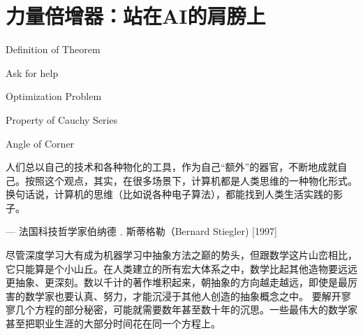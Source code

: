 \chapter{力量倍增器：站在AI的肩膀上}
 \begin{introduction}
  \item Definition of Theorem
  \item Ask for help
  \item Optimization Problem
  \item Property of Cauchy Series
  \item Angle of Corner
\end{introduction}


人们总以自己的技术和各种物化的工具，作为自己“额外”的器官，不断地成就自己。按照这个观点，其实，在很多场景下，计算机都是人类思维的一种物化形式。换句话说，计算机的思维（比如说各种电子算法），都能找到人类生活实践的影子。

\begin{flushright}
— 法国科技哲学家伯纳德﹒斯蒂格勒（Bernard Stiegler)  [1997]
\end{flushright}




尽管深度学习大有成为机器学习中抽象方法之巅的势头，但跟数学这片山峦相比，它只能算是个小山丘。在人类建立的所有宏大体系之中，数学比起其他造物要远远更抽象、更深刻。数以千计的著作堆积起来，朝抽象的方向越走越远，即使是最厉害的数学家也要认真、努力，才能沉浸于其他人创造的抽象概念之中。
要解开寥寥几个方程的部分秘密，可能就需要数年甚至数十年的沉思。一些最伟大的数学家甚至把职业生涯的大部分时间花在同一个方程上。



